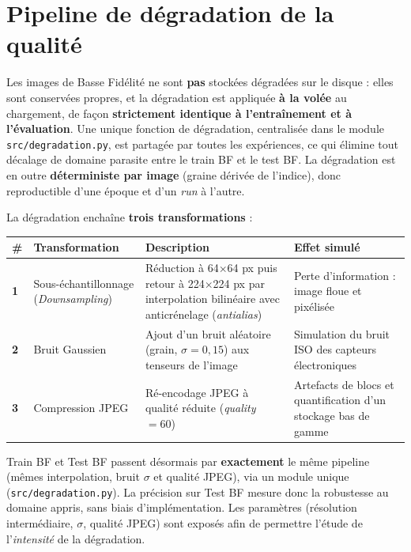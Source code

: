 \documentclass[11pt,a4paper,openany]{book}
\newcommand{\tableheadcolor}{\rowcolor{headerbg}}
\newcommand{\tablerowodd}{}
\begin{document}
\section{Pipeline de dégradation de la qualité}

Les images de Basse Fidélité ne sont \textbf{pas} stockées dégradées sur le disque : elles sont conservées propres, et la dégradation est appliquée \textbf{à la volée} au chargement, de façon \textbf{strictement identique à l'entraînement et à l'évaluation}. Une unique fonction de dégradation, centralisée dans le module \texttt{src/degradation.py}, est partagée par toutes les expériences, ce qui élimine tout décalage de domaine parasite entre le train BF et le test BF. La dégradation est en outre \textbf{déterministe par image} (graine dérivée de l'indice), donc reproductible d'une époque et d'un \textit{run} à l'autre.

La dégradation enchaîne \textbf{trois transformations} :

\vspace{0.8em}
\renewcommand{\arraystretch}{1.5}
\begin{tabularx}{\linewidth}{C{0.6cm} L{3.5cm} L{5.5cm} L{6cm}}
  \toprule
  \tableheadcolor
  \textbf{\#} &
  \textbf{Transformation} &
  \textbf{Description} &
  \textbf{Effet simulé} \\
  \midrule
  \tablerowodd
  \textbf{1} & Sous-échantillonnage (\textit{Downsampling}) &
    Réduction à 64$\times$64 px puis retour à 224$\times$224 px par interpolation bilinéaire avec anticrénelage (\textit{antialias}) &
    Perte d'information : image floue et pixélisée \\
  \textbf{2} & Bruit Gaussien &
    Ajout d'un bruit aléatoire (grain, $\sigma=0{,}15$) aux tenseurs de l'image &
    Simulation du bruit ISO des capteurs électroniques\\
  \tablerowodd
  \textbf{3} & Compression JPEG &
    Ré-encodage JPEG à qualité réduite (\textit{quality}~$=60$) &
    Artefacts de blocs et quantification d'un stockage bas de gamme \\
  \bottomrule
\end{tabularx}

\begin{hypothesebox}
  Train BF et Test BF passent désormais par \textbf{exactement} le même pipeline (mêmes interpolation, bruit $\sigma$ et qualité JPEG), via un module unique (\texttt{src/degradation.py}). La précision sur Test BF mesure donc la robustesse au domaine appris, sans biais d'implémentation. Les paramètres (résolution intermédiaire, $\sigma$, qualité JPEG) sont exposés afin de permettre l'étude de l'\emph{intensité} de la dégradation.
\end{hypothesebox}
\end{document}
